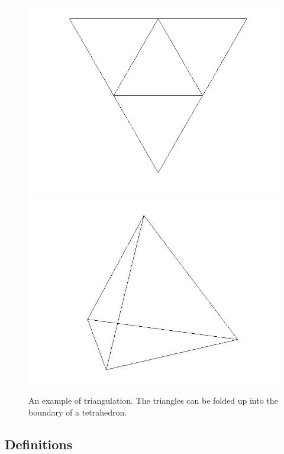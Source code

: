 \documentclass[12pt]{article}
\begin{document}
  
\begin{figure}
\includegraphics[scale = 0.5]{flattetrahedron.png}
\includegraphics[scale = 0.3]{tetrahedron.jpg}
\caption{An example of triangulation. The triangles can be folded up into the boundary of a tetrahedron.}
\end{figure}

\subsection{Definitions}
\maketitle
\end{document}
